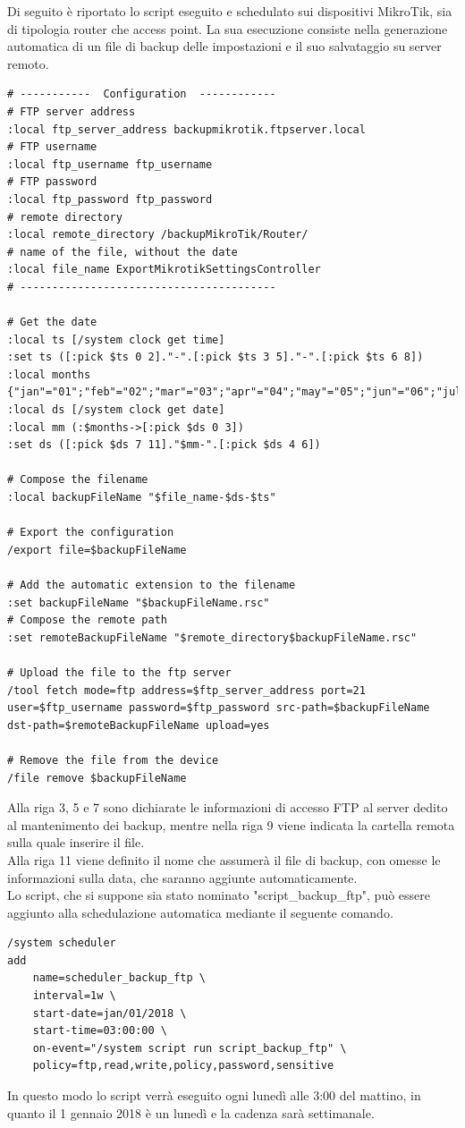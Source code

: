 \documentclass[Tesi.tex]{subfiles}
\begin{document}
Di seguito è riportato lo script eseguito e schedulato sui dispositivi MikroTik, sia di tipologia router che access point. La sua esecuzione consiste nella generazione automatica di un file di backup delle impostazioni e il suo salvataggio su server  remoto.

\begin{lstlisting}[caption=Script per il backup dei device MikroTik]
# -----------  Configuration  ------------
# FTP server address
:local ftp_server_address backupmikrotik.ftpserver.local
# FTP username
:local ftp_username ftp_username
# FTP password
:local ftp_password ftp_password
# remote directory
:local remote_directory /backupMikroTik/Router/
# name of the file, without the date
:local file_name ExportMikrotikSettingsController
# ----------------------------------------	

# Get the date
:local ts [/system clock get time]
:set ts ([:pick $ts 0 2]."-".[:pick $ts 3 5]."-".[:pick $ts 6 8])
:local months {"jan"="01";"feb"="02";"mar"="03";"apr"="04";"may"="05";"jun"="06";"jul"="07";"aug"="08";"sep"="09";"oct"="10";"nov"="11";"dec"="12"};
:local ds [/system clock get date]
:local mm (:$months->[:pick $ds 0 3])
:set ds ([:pick $ds 7 11]."$mm-".[:pick $ds 4 6])

# Compose the filename
:local backupFileName "$file_name-$ds-$ts"

# Export the configuration
/export file=$backupFileName

# Add the automatic extension to the filename
:set backupFileName "$backupFileName.rsc"
# Compose the remote path
:set remoteBackupFileName "$remote_directory$backupFileName.rsc"

# Upload the file to the ftp server
/tool fetch mode=ftp address=$ftp_server_address port=21 user=$ftp_username password=$ftp_password src-path=$backupFileName dst-path=$remoteBackupFileName upload=yes

# Remove the file from the device
/file remove $backupFileName
\end{lstlisting}

Alla riga 3, 5 e 7 sono dichiarate le informazioni di accesso FTP al server dedito al mantenimento dei backup, mentre nella riga 9 viene indicata la cartella remota sulla quale inserire il file.\\
Alla riga 11 viene definito il nome che assumerà il file di backup, con omesse le informazioni sulla data, che saranno aggiunte automaticamente. \\

Lo script, che si suppone sia stato nominato "script\_backup\_ftp", può essere aggiunto alla schedulazione automatica mediante il seguente comando. \\

\begin{lstlisting}[caption=Comando per la schedulazione del backup]
/system scheduler
add
	name=scheduler_backup_ftp \
	interval=1w \
	start-date=jan/01/2018 \
	start-time=03:00:00 \
	on-event="/system script run script_backup_ftp" \
	policy=ftp,read,write,policy,password,sensitive
\end{lstlisting}

In questo modo lo script verrà eseguito ogni lunedì alle 3:00 del mattino, in quanto il 1 gennaio 2018 è un lunedì e la cadenza sarà settimanale.
\end{document}
